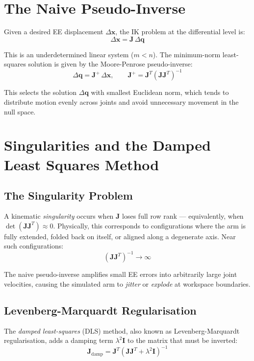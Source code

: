 \documentclass[11pt, a4paper]{article}
\begin{document}
\section{The Naive Pseudo-Inverse}

Given a desired EE displacement $\Delta \mathbf{x}$, the IK problem at the differential level is:
\[
  \Delta \mathbf{x} = \mathbf{J}\,\Delta \mathbf{q}
\]

This is an underdetermined linear system ($m < n$). The minimum-norm least-squares solution is given by the Moore-Penrose pseudo-inverse:
\[
  \Delta \mathbf{q} = \mathbf{J}^{+}\,\Delta \mathbf{x}, \qquad
  \mathbf{J}^{+} = \mathbf{J}^T\!\left(\mathbf{J}\mathbf{J}^T\right)^{-1}
\]

This selects the solution $\Delta \mathbf{q}$ with smallest Euclidean norm, which tends to distribute motion evenly across joints and avoid unnecessary movement in the null space.

\section{Singularities and the Damped Least Squares Method}

\subsection{The Singularity Problem}

A kinematic \emph{singularity} occurs when $\mathbf{J}$ loses full row rank — equivalently, when $\det(\mathbf{J}\mathbf{J}^T) \approx 0$. Physically, this corresponds to configurations where the arm is fully extended, folded back on itself, or aligned along a degenerate axis. Near such configurations:
\[
  \left(\mathbf{J}\mathbf{J}^T\right)^{-1} \longrightarrow \infty
\]

The naive pseudo-inverse amplifies small EE errors into arbitrarily large joint velocities, causing the simulated arm to \emph{jitter} or \emph{explode} at workspace boundaries.

\subsection{Levenberg-Marquardt Regularisation}

The \emph{damped least-squares} (DLS) method, also known as Levenberg-Marquardt regularisation, adds a damping term $\lambda^2\mathbf{I}$ to the matrix that must be inverted:
\[
  \boxed{
    \mathbf{J}_{\text{damp}} = \mathbf{J}^T\!\left(\mathbf{J}\mathbf{J}^T + \lambda^2\mathbf{I}\right)^{-1}
  }
\]
\end{document}
